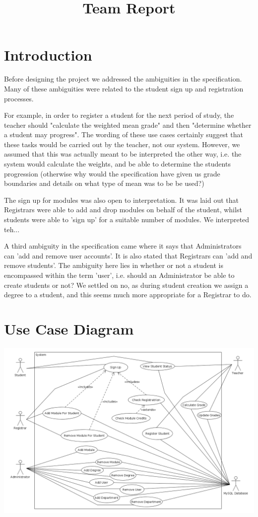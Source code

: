 \documentclass[12pt,a4paper]{article}
\title{Team Report}
\begin{document}
\maketitle

\section{Introduction}
Before designing the project we addressed the ambiguities in the specification.
Many of these ambiguities were related to the student sign up and registration
processes.

For example, in order to register a student for the next period of study, the
teacher  should "calculate the weighted mean grade" and then "determine
whether a student may progress". The wording of these use cases certainly suggest that
these tasks would be carried out by the teacher, not our system. However, we assumed
that this was actually meant to be interpreted the other way, i.e. the system
would calculate the weights, and be able to determine the students progression
(otherwise why would the specification have given us grade boundaries and details on what
type of mean was to be be used?)

The sign up for modules was also open to interpretation. It was laid out that
Registrars were able to add and drop modules on behalf of the student, whilst
students were able to 'sign up' for a suitable number of modules. We interpreted
teh...

A third ambiguity in the specification came where it says that Administrators can
'add and remove user accounts'. It is also stated that Registrars can 'add and remove
students'. The ambiguity here lies in whether or not a student is encompassed within
the term 'user', i.e. should an Administrator be able to create students or not? We
settled on no, as during student creation we assign a degree to a student, and this
seems much more appropriate for a Registrar to do.


\section{Use Case Diagram}

\centerline{\includegraphics[width=20cm]{useCaseDiagram2}}
\end{document}
